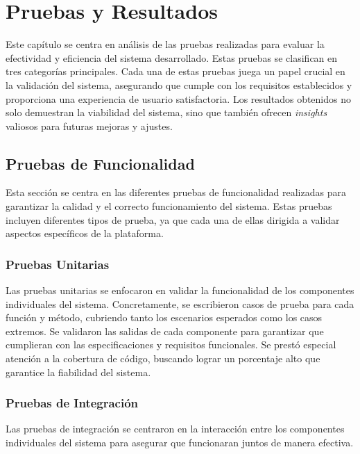 \chapter{Pruebas y Resultados} \label{chap:resultadosExperimentales}

Este capítulo se centra en análisis de las pruebas realizadas para evaluar la efectividad y eficiencia del sistema desarrollado. Estas pruebas se clasifican en tres categorías principales. Cada una de estas pruebas juega un papel crucial en la validación del sistema, asegurando que cumple con los requisitos establecidos y proporciona una experiencia de usuario satisfactoria. Los resultados obtenidos no solo demuestran la viabilidad del sistema, sino que también ofrecen \textit{insights} valiosos para futuras mejoras y ajustes.

\section{Pruebas de Funcionalidad}

Esta sección se centra en las diferentes pruebas de funcionalidad realizadas para garantizar la calidad y el correcto funcionamiento del sistema. Estas pruebas incluyen diferentes tipos de prueba, ya que cada una de ellas dirigida a validar aspectos específicos de la plataforma.

\subsection{Pruebas Unitarias}

Las pruebas unitarias se enfocaron en validar la funcionalidad de los componentes individuales del sistema. Concretamente, se escribieron casos de prueba para cada función y método, cubriendo tanto los escenarios esperados como los casos extremos. Se validaron las salidas de cada componente para garantizar que cumplieran con las especificaciones y requisitos funcionales. Se prestó especial atención a la cobertura de código, buscando lograr un porcentaje alto que garantice la fiabilidad del sistema.

\subsection{Pruebas de Integración}

Las pruebas de integración se centraron en la interacción entre los componentes individuales del sistema para asegurar que funcionaran juntos de manera efectiva.

